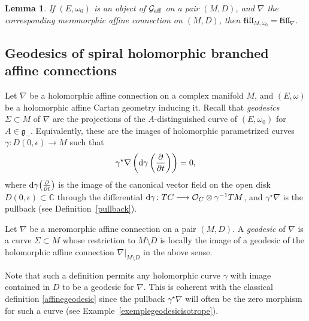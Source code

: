 \documentclass[pdftex]{sigma}
\newcommand{\der}[2]{\frac{\partial #1}{\partial#2}}
\numberwithin{equation}{section}
\newtheorem{Lemma}[Theorem]{Lemma}
\begin{document}
\begin{Lemma}If $(E,\omega_0)$ is an object of $\mathcal{G}_{\rm aff}$ on a pair $(M,D)$, and $\nabla$ the corresponding meromorphic affine connection on $(M,D)$, then $\mathfrak{k}\mathfrak{i}\mathfrak{l}\mathfrak{l}_{M,\omega_0}=\mathfrak{k}\mathfrak{i}\mathfrak{l}\mathfrak{l}_{\nabla}$. \end{Lemma}

\subsection{Geodesics of spiral holomorphic branched affine connections}

Let $\nabla$ be a holomorphic affine connection on a complex manifold $M$, and $(E,\omega)$ be a holomorphic affine Cartan geometry inducing it. Recall that \textit{geodesics} $\Sigma\subset M$ of $\nabla$ are the projections of the $A$-distinguished curve of $(E,\omega_0)$ for $A\in \mathfrak{g}_-$. Equivalently, these are the images of holomorphic parametrized curves $\gamma\colon D(0,\epsilon) \longrightarrow M$ such that
\begin{gather}\label{affinegeodesic} \gamma^\star \nabla \left({\rm d}\gamma\left(\der{}{t}\right)\right) = 0, \end{gather}
where ${\rm d}\gamma\big(\der{}{t}\big)$ is the image of the canonical vector field on the open disk $D(0,\epsilon) \subset \mathbb{C}$ through the differential ${\rm d}\gamma \colon TC \longrightarrow \mathcal{O}_C\otimes \gamma^{-1}TM$, and $\gamma^\star \nabla$ is the pullback (see Definition~\ref{pullback}).
\begin{Definition}\label{meromorphicgeodesics}Let $\nabla$ be a meromorphic affine connection on a pair $(M,D)$. A \textit{geodesic} of $\nabla$ is a curve $\Sigma \subset M$ whose restriction to $M\setminus D$ is locally the image of a geodesic of the holomorphic affine connection $\nabla\vert_{M\setminus D}$ in the above sense.
 \end{Definition}

Note that such a definition permits any holomorphic curve $\gamma$ with image contained in $D$ to be a geodesic for $\nabla$. This is coherent with the classical definition \eqref{affinegeodesic} since the pullback $\gamma^\star \nabla$ will often be the zero morphism for such a curve (see Example~\ref{exemplegeodesicisotrope}).
\end{document}
